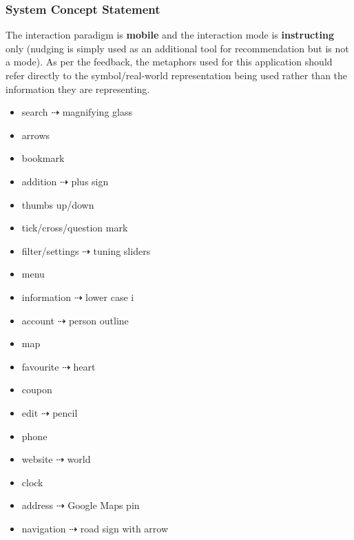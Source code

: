 \documentclass[a4 paper, 12pt]{article}
\begin{document}
        \subsubsection{System Concept Statement}
        The interaction paradigm is \textbf{mobile} and the interaction mode is \textbf{instructing} only (nudging is simply used as an additional tool for recommendation but is not a mode). As per the feedback, the metaphors used for this application should refer directly to the symbol/real-world representation being used rather than the information they are representing.  
            \begin{multicols}{2}
                \begin{itemize}
                    \item search $\dashrightarrow$ magnifying glass
                    \item arrows 
                    \item bookmark 
                    \item addition $\dashrightarrow$ plus sign
                    \item thumbs up/down 
                    \item tick/cross/question mark 
                    \item filter/settings $\dashrightarrow$ tuning sliders 
                    \item menu
                    \item information $\dashrightarrow$ lower case i 
                    \item account $\dashrightarrow$ person outline 
                    \item map 
                    \item favourite $\dashrightarrow$ heart 
                    \item coupon
                    \item edit $\dashrightarrow$ pencil
                    \item phone
                    \item website $\dashrightarrow$ world
                    \item clock
                    \item address $\dashrightarrow$ Google Maps pin
                    \item navigation $\dashrightarrow$ road sign with arrow
                \end{itemize}
            \end{multicols}
\end{document}
